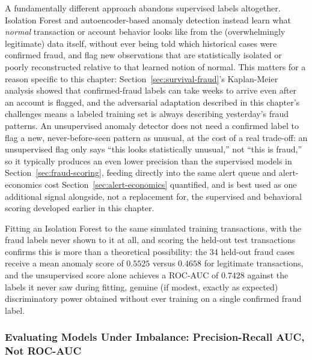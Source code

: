 \documentclass[../ai_in_finance]{subfiles}
\begin{document}
A fundamentally different approach abandons supervised labels altogether. Isolation Forest and autoencoder-based anomaly detection instead learn what \emph{normal} transaction or account behavior looks like from the (overwhelmingly legitimate) data itself, without ever being told which historical cases were confirmed fraud, and flag new observations that are statistically isolated or poorly reconstructed relative to that learned notion of normal. This matters for a reason specific to this chapter: Section~\ref{sec:survival-fraud}'s Kaplan-Meier analysis showed that confirmed-fraud labels can take weeks to arrive even after an account is flagged, and the adversarial adaptation described in this chapter's challenges means a labeled training set is always describing yesterday's fraud patterns. An unsupervised anomaly detector does not need a confirmed label to flag a new, never-before-seen pattern as unusual, at the cost of a real trade-off: an unsupervised flag only says ``this looks statistically unusual,'' not ``this is fraud,'' so it typically produces an even lower precision than the supervised models in Section~\ref{sec:fraud-scoring}, feeding directly into the same alert queue and alert-economics cost Section~\ref{sec:alert-economics} quantified, and is best used as one additional signal alongside, not a replacement for, the supervised and behavioral scoring developed earlier in this chapter.

Fitting an Isolation Forest to the same simulated training transactions, with the fraud labels never shown to it at all, and scoring the held-out test transactions confirms this is more than a theoretical possibility: the 34 held-out fraud cases receive a mean anomaly score of $0.5525$ versus $0.4658$ for legitimate transactions, and the unsupervised score alone achieves a ROC-AUC of $0.7428$ against the labels it never saw during fitting, genuine (if modest, exactly as expected) discriminatory power obtained without ever training on a single confirmed fraud label.

\subsubsection*{Evaluating Models Under Imbalance: Precision-Recall AUC, Not ROC-AUC}
\end{document}
